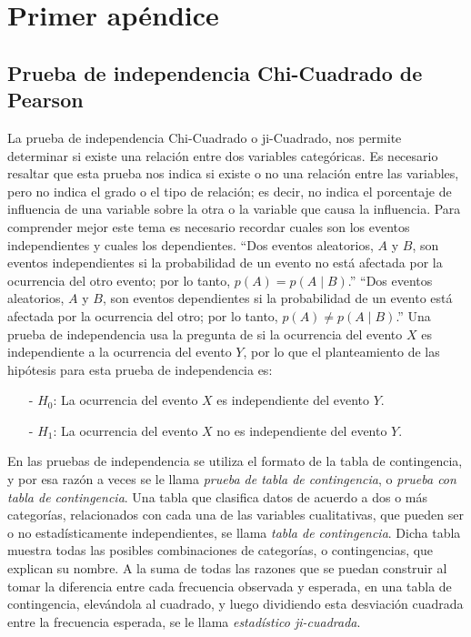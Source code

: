 
\appendix
\chapter{Primer apéndice}
\section{Prueba de independencia Chi-Cuadrado de Pearson}
La prueba de independencia Chi-Cuadrado o ji-Cuadrado, nos permite determinar si existe una relación entre dos variables categóricas. Es necesario resaltar que esta prueba nos indica si existe o no una relación entre las variables, pero no indica el grado o el tipo de relación; es decir, no indica el porcentaje de influencia de una variable sobre la otra o la variable que causa la influencia.
\vskip 0.5cm
Para comprender mejor este tema es necesario recordar cuales son los eventos independientes y cuales los dependientes.
\vskip 0.5cm
“Dos eventos aleatorios, $A$ y $B$, son eventos independientes si la probabilidad de un evento no está afectada por la ocurrencia del otro evento; por lo tanto, $p(A) = p(A \mid B)$.”
\vskip 0.5cm
“Dos eventos aleatorios, $A$ y $B$, son eventos dependientes si la probabilidad de un evento está afectada por la ocurrencia del otro; por lo tanto, $p(A) \neq p(A \mid B)$.”
\vskip 0.5cm
Una prueba de independencia usa la pregunta de si la ocurrencia del evento $X$ es independiente a la ocurrencia del evento $Y$, por lo que el planteamiento de las hipótesis para esta prueba de independencia es:
\begin{enumerate}
\item[-]$H_{0}$: La ocurrencia del evento $X$ es independiente del evento $Y$.
\item[-]$H_{1}$: La ocurrencia del evento $X$ no es independiente del evento $Y$.
\end{enumerate}
En las pruebas de independencia se utiliza el formato de la tabla de contingencia, y por esa razón a veces se le llama \textit{prueba de tabla de contingencia}, o \textit{prueba con tabla de contingencia}.
\vskip 0.5cm
Una tabla que clasifica datos de acuerdo a dos o más categorías, relacionados con cada una de las variables cualitativas, que pueden ser o no estadísticamente independientes, se llama \textit{tabla de contingencia}. Dicha tabla muestra todas las posibles combinaciones de categorías, o contingencias, que explican su nombre.
\vskip 0.5cm
A la suma de todas las razones que se puedan construir al tomar la diferencia entre cada frecuencia observada y esperada, en una tabla de contingencia, elevándola al cuadrado, y luego dividiendo esta desviación cuadrada entre la frecuencia esperada, se le llama \textit{estadístico ji-cuadrada}.
